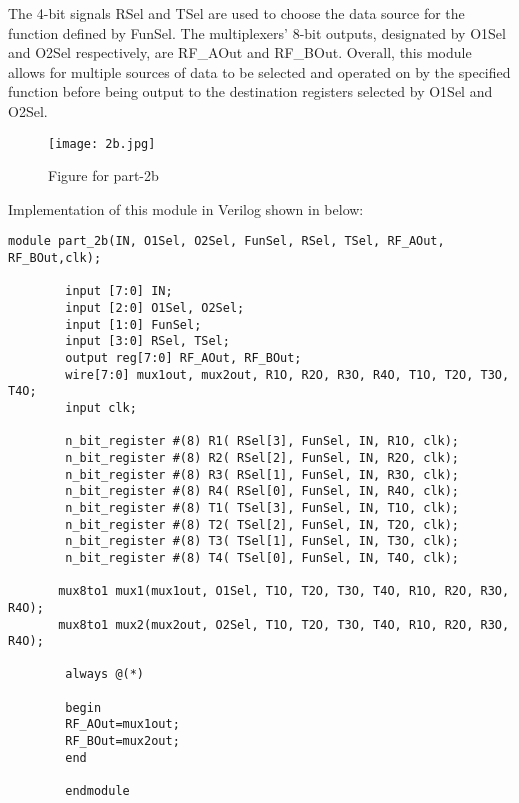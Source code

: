 \documentclass[12pt]{article}
\begin{document}
The 4-bit signals RSel and TSel are used to choose the data source for the function defined by FunSel. The multiplexers' 8-bit outputs, designated by O1Sel and O2Sel respectively, are RF\_AOut and RF\_BOut. 
Overall, this module allows for multiple sources of data to be selected and operated on by the specified function before being output to the destination registers selected by O1Sel and O2Sel.

\begin{figure}[H]
    \centering
    \texttt{[image: 2b.jpg]}
    \caption{Figure for part-2b}
    \label{fig:part2b}
\end{figure}



\vspace{1cm}
Implementation of this module in Verilog shown in below:

\vspace{0.5cm}
\begin{lstlisting}
module part_2b(IN, O1Sel, O2Sel, FunSel, RSel, TSel, RF_AOut, RF_BOut,clk);
                  
        input [7:0] IN;
        input [2:0] O1Sel, O2Sel;
        input [1:0] FunSel;
        input [3:0] RSel, TSel;
        output reg[7:0] RF_AOut, RF_BOut;
        wire[7:0] mux1out, mux2out, R1O, R2O, R3O, R4O, T1O, T2O, T3O, T4O;
        input clk;
                    
        n_bit_register #(8) R1( RSel[3], FunSel, IN, R1O, clk);
        n_bit_register #(8) R2( RSel[2], FunSel, IN, R2O, clk);
        n_bit_register #(8) R3( RSel[1], FunSel, IN, R3O, clk);
        n_bit_register #(8) R4( RSel[0], FunSel, IN, R4O, clk);
        n_bit_register #(8) T1( TSel[3], FunSel, IN, T1O, clk);
        n_bit_register #(8) T2( TSel[2], FunSel, IN, T2O, clk);
        n_bit_register #(8) T3( TSel[1], FunSel, IN, T3O, clk);
        n_bit_register #(8) T4( TSel[0], FunSel, IN, T4O, clk);
                
       mux8to1 mux1(mux1out, O1Sel, T1O, T2O, T3O, T4O, R1O, R2O, R3O, R4O);
       mux8to1 mux2(mux2out, O2Sel, T1O, T2O, T3O, T4O, R1O, R2O, R3O, R4O);
        
        always @(*)
        
        begin
        RF_AOut=mux1out;
        RF_BOut=mux2out;
        end
                
        endmodule
\end{lstlisting}

\clearpage
\end{document}
